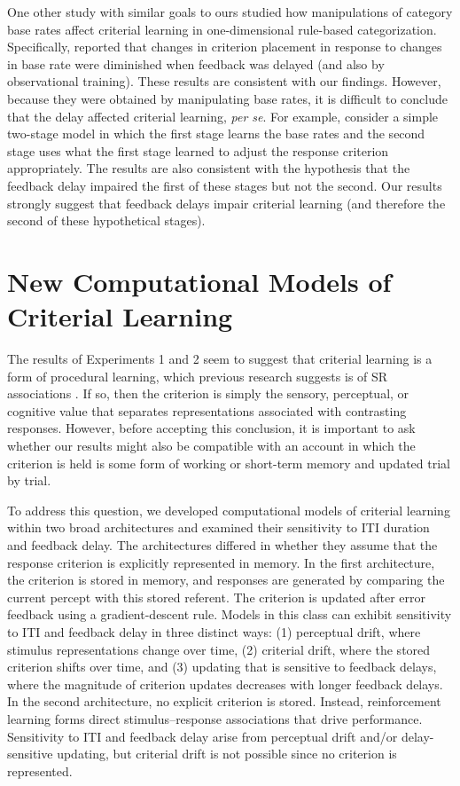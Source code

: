 \documentclass[doc, floatsintext]{apa7}
\begin{document}
One other study with similar goals to ours studied how
manipulations of category base rates affect criterial
learning in one-dimensional rule-based categorization.
Specifically, \textcite{bohil2014implicit} reported that
changes in criterion placement in response to changes in
base rate were diminished when feedback was delayed (and
also by observational training). These results are
consistent with our findings. However, because they were
obtained by manipulating base rates, it is difficult to
conclude that the delay affected criterial learning,
\emph{per se}. For example, consider a simple two-stage
model in which the first stage learns the base rates and the
second stage uses what the first stage learned to adjust the
response criterion appropriately. The
\textcite{bohil2014implicit} results are also consistent
with the hypothesis that the feedback delay impaired the
first of these stages but not the second. Our results
strongly suggest that feedback delays impair criterial
learning (and therefore the second of these hypothetical
stages).

\section{New Computational Models of Criterial Learning}
The results of Experiments 1 and 2 seem to suggest that
criterial learning is a form of procedural learning, which
previous research suggests is of SR associations
\parencite{AshbyWaldron1999, CasaleEtAl2012}. If so, then
the criterion is simply the sensory, perceptual, or
cognitive value that separates representations associated
with contrasting responses. However, before accepting this
conclusion, it is important to ask whether our results might
also be compatible with an account in which the criterion is
held is some form of working or short-term memory and
updated trial by trial. 

To address this question, we developed computational models
of criterial learning within two broad architectures and
examined their sensitivity to ITI duration and feedback
delay. The architectures differed in whether they assume
that the response criterion is explicitly represented in
memory. In the first architecture, the criterion is stored
in memory, and responses are generated by comparing the
current percept with this stored referent. The criterion is
updated after error feedback using a gradient-descent rule.
Models in this class can exhibit sensitivity to ITI and
feedback delay in three distinct ways: (1) perceptual drift,
where stimulus representations change over time, (2)
criterial drift, where the stored criterion shifts over
time, and (3) updating that is sensitive to feedback delays,
where the magnitude of criterion updates decreases with
longer feedback delays. In the second architecture, no
explicit criterion is stored. Instead, reinforcement
learning forms direct stimulus--response associations that
drive performance.  Sensitivity to ITI and feedback delay
arise from perceptual drift and/or delay-sensitive updating,
but criterial drift is not possible since no criterion is
represented.
\end{document}
